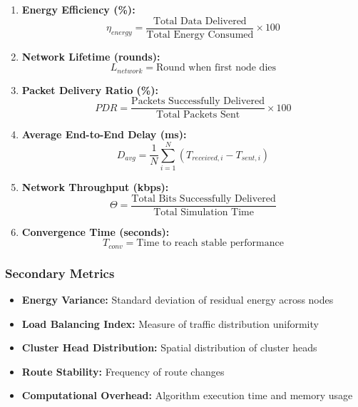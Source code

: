\documentclass[conference]{IEEEtran}
\begin{document}
\begin{enumerate}
    \item \textbf{Energy Efficiency (\%):}
    \begin{equation}
    \eta_{energy} = \frac{\text{Total Data Delivered}}{\text{Total Energy Consumed}} \times 100
    \end{equation}
    
    \item \textbf{Network Lifetime (rounds):}
    \begin{equation}
    L_{network} = \text{Round when first node dies}
    \end{equation}
    
    \item \textbf{Packet Delivery Ratio (\%):}
    \begin{equation}
    PDR = \frac{\text{Packets Successfully Delivered}}{\text{Total Packets Sent}} \times 100
    \end{equation}
    
    \item \textbf{Average End-to-End Delay (ms):}
    \begin{equation}
    D_{avg} = \frac{1}{N} \sum_{i=1}^{N} (T_{received,i} - T_{sent,i})
    \end{equation}
    
    \item \textbf{Network Throughput (kbps):}
    \begin{equation}
    \Theta = \frac{\text{Total Bits Successfully Delivered}}{\text{Total Simulation Time}}
    \end{equation}
    
    \item \textbf{Convergence Time (seconds):}
    \begin{equation}
    T_{conv} = \text{Time to reach stable performance}
    \end{equation}
\end{enumerate}

\subsubsection{Secondary Metrics}

\begin{itemize}
    \item \textbf{Energy Variance:} Standard deviation of residual energy across nodes
    \item \textbf{Load Balancing Index:} Measure of traffic distribution uniformity
    \item \textbf{Cluster Head Distribution:} Spatial distribution of cluster heads
    \item \textbf{Route Stability:} Frequency of route changes
    \item \textbf{Computational Overhead:} Algorithm execution time and memory usage
\end{itemize}
\end{document}
